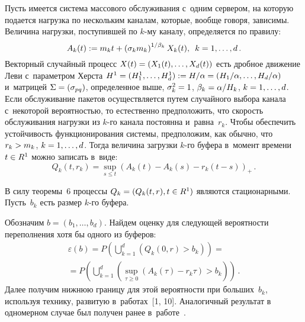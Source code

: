 \begin{multicols}{2}
Пусть имеется система массового обслуживания с~одним сервером, на которую подается нагрузка по нескольким каналам, которые, вообще говоря, зависимы.
Величина нагрузки, поступившей по $k$-му каналу, определяется по правилу:
$$
A_k (t) := m_k t + \left(\sigma_k m_k \right)^{1/\beta_k}  X_k (t), \enskip
k=1,\ldots , d\,.
$$
Векторный случайный процесс $X(t) \hm= (X_1 (t) , \ldots , X_d (t))$
есть дробное движение Леви с~параметром Херста $H^1 \hm= (H_1^1 ,
\ldots , H_d^1 ) := H/\alpha \hm= (H_1 /\alpha , \ldots , H_d /\alpha
)$ и~матрицей $\Sigma \hm= (\sigma_{pq} )$, определенное выше,
$\sigma_k^2 \hm=1$, $\beta_k \hm=  \alpha/H_k $, $k\hm=1, \ldots , d$. Если
обслуживание пакетов осуществляется путем случайного выбора канала 
с~некоторой ве\-ро\-ят\-ностью, то естественно предположить, что скорость
обслуживания нагрузки из $k$-го канала постоянна и~равна~$r_k$.
Чтобы обеспечить устойчивость функционирования системы, предположим,
как обычно, что $r_k\hm > m_k$, $k\hm=1, \ldots , d$. Тогда величина
загрузки $k$-го буфера в~момент времени $t\hm\in R^1$ можно записать в~виде:
$$
Q_k (t,r_k ) = \sup\limits_{s\leq t} (A_k (t) - A_k (s) - r_k 
(t-s))_{+}\,.
$$



В силу теоремы~6 процессы $Q_k \hm= (Q_k (t,r), t\hm\in R^1)$ являются стационарными. 
Пусть~$b_k$ есть размер $k$-го буфера.

Обозначим $b=(b_1 , \ldots , b_d )$. Найдем оценку для следующей вероятности 
переполнения хотя бы одного из буферов:
\begin{multline*}
\varepsilon (b) = P\left(\bigcup\limits_{k=1}^d \left(Q_k (0, r) > b_k \right)\right) ={}\\
{}=
P\left(\bigcup\limits_{k=1}^d \left(\sup\limits_{\tau \geq 0} (A_k (\tau ) - 
r_k  \tau ) >b_k \right)\right)\, .
\end{multline*}
Далее получим нижнюю границу для этой вероятности при больших~$b_k$,
используя технику, развитую в~работах~[1, 10]. Аналогичный результат
в одномерном случае был получен ранее в~работе~\cite{Ni12}.



\end{multicols}
